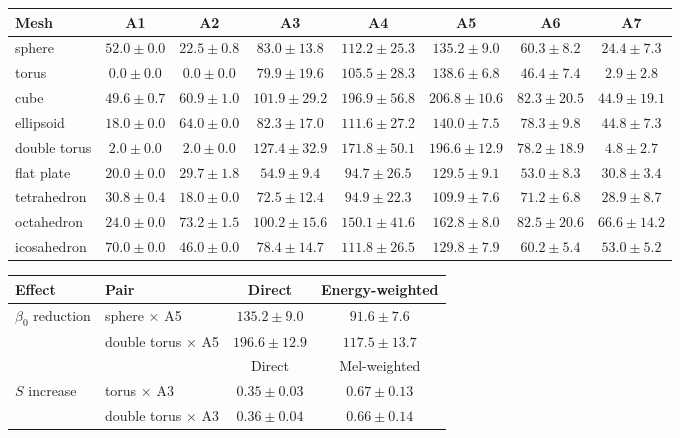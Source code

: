 \documentclass[]{interact}
\theoremstyle{plain}
\theoremstyle{definition}
\theoremstyle{remark}
\begin{document}
\begin{table}[t]
{\begin{tabular}{lccccccc} \toprule
Mesh & A1 & A2 & A3 & A4 & A5 & A6 & A7 \\ \midrule
sphere
  & $52.0\pm0.0$ & $22.5\pm0.8$ & $83.0\pm13.8$ & $112.2\pm25.3$
  & $135.2\pm9.0$ & $60.3\pm8.2$ & $24.4\pm7.3$ \\
torus
  & $0.0\pm0.0$ & $0.0\pm0.0$ & $79.9\pm19.6$ & $105.5\pm28.3$
  & $138.6\pm6.8$ & $46.4\pm7.4$ & $2.9\pm2.8$ \\
cube
  & $49.6\pm0.7$ & $60.9\pm1.0$ & $101.9\pm29.2$ & $196.9\pm56.8$
  & $206.8\pm10.6$ & $82.3\pm20.5$ & $44.9\pm19.1$ \\
ellipsoid
  & $18.0\pm0.0$ & $64.0\pm0.0$ & $82.3\pm17.0$ & $111.6\pm27.2$
  & $140.0\pm7.5$ & $78.3\pm9.8$ & $44.8\pm7.3$ \\
double torus
  & $2.0\pm0.0$ & $2.0\pm0.0$ & $127.4\pm32.9$ & $171.8\pm50.1$
  & $196.6\pm12.9$ & $78.2\pm18.9$ & $4.8\pm2.7$ \\
flat plate
  & $20.0\pm0.0$ & $29.7\pm1.8$ & $54.9\pm9.4$ & $94.7\pm26.5$
  & $129.5\pm9.1$ & $53.0\pm8.3$ & $30.8\pm3.4$ \\
tetrahedron
  & $30.8\pm0.4$ & $18.0\pm0.0$ & $72.5\pm12.4$ & $94.9\pm22.3$
  & $109.9\pm7.6$ & $71.2\pm6.8$ & $28.9\pm8.7$ \\
octahedron
  & $24.0\pm0.0$ & $73.2\pm1.5$ & $100.2\pm15.6$ & $150.1\pm41.6$
  & $162.8\pm8.0$ & $82.5\pm20.6$ & $66.6\pm14.2$ \\
icosahedron
  & $70.0\pm0.0$ & $46.0\pm0.0$ & $78.4\pm14.7$ & $111.8\pm26.5$
  & $129.8\pm7.9$ & $60.2\pm5.4$ & $53.0\pm5.2$ \\
\bottomrule
\end{tabular}}
\label{tab:beta0}
\end{table}

\begin{table}[t]
{\begin{tabular}{llcc} \toprule
Effect & Pair & Direct & Energy-weighted \\ \midrule
$\beta_0$ reduction
  & sphere $\times$ A5 & $135.2 \pm 9.0$ & $91.6 \pm 7.6$ \\
  & double torus $\times$ A5 & $196.6 \pm 12.9$ & $117.5 \pm 13.7$ \\
\addlinespace
  & & Direct & Mel-weighted \\
  \cmidrule(l){3-4}
$S$ increase
  & torus $\times$ A3 & $0.35 \pm 0.03$ & $0.67 \pm 0.13$ \\
  & double torus $\times$ A3 & $0.36 \pm 0.04$ & $0.66 \pm 0.14$ \\
\bottomrule
\end{tabular}}
\label{tab:mapping}
\end{table}
\end{document}
